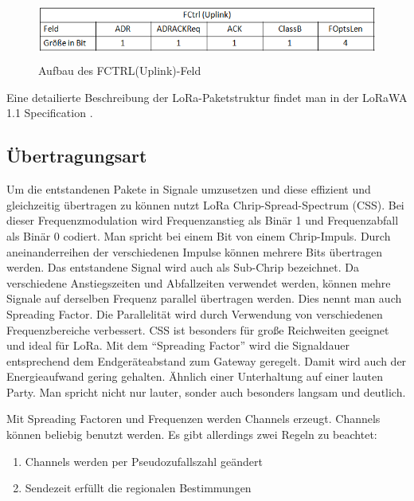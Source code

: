 \documentclass[a4paper, 12pt]{article}
\begin{document}
                \begin{figure}[ht]
                    \centering
                    \includegraphics[height=2cm]{FCtrlUplink}
                    \caption{Aufbau des FCTRL(Uplink)-Feld}
                \end{figure}

                Eine detailierte Beschreibung der LoRa-Paketstruktur findet man in der LoRaWA 1.1 Specification \cite{LoRaSpec}.   
                
                
        \subsection{Übertragungsart}\label{sec:Modulation}
            Um die entstandenen Pakete in Signale umzusetzen und diese effizient und gleichzeitig übertragen zu können
            nutzt LoRa Chrip-Spread-Spectrum (CSS). Bei dieser Frequenzmodulation wird Frequenzanstieg als Binär 1 und 
            Frequenzabfall als Binär 0 codiert. Man spricht bei einem Bit von einem Chrip-Impuls. Durch 
            aneinanderreihen der verschiedenen Impulse können mehrere Bits übertragen werden. Das entstandene Signal 
            wird auch als Sub-Chrip bezeichnet. Da verschiedene Anstiegszeiten und Abfallzeiten verwendet werden, können  
            mehre Signale auf derselben Frequenz parallel übertragen werden. Dies nennt man auch Spreading Factor. 
            Die Parallelität wird durch Verwendung von verschiedenen Frequenzbereiche verbessert. 
            CSS ist besonders für große Reichweiten geeignet und ideal für LoRa. 
            Mit dem ``Spreading Factor'' wird die Signaldauer entsprechend dem Endgeräteabstand zum Gateway geregelt.
            Damit wird auch der Energieaufwand gering gehalten. Ähnlich einer Unterhaltung auf einer lauten Party. 
            Man spricht nicht nur lauter, sonder auch besonders langsam und deutlich.\cite{explain}

            Mit Spreading Factoren und Frequenzen werden Channels erzeugt. Channels können 
            beliebig benutzt werden. Es gibt allerdings zwei Regeln zu beachtet: 
            \begin{enumerate}   
                \item Channels werden per Pseudozufallszahl geändert
                \item Sendezeit erfüllt die regionalen Bestimmungen
            \end{enumerate}
            
\end{document}
